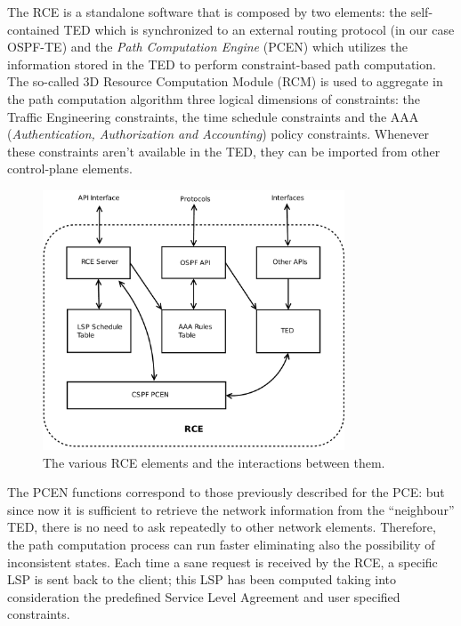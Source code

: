 \documentclass[10pt,a4paper]{report}
\begin{document}
The RCE is a standalone software that is composed by two elements: the
self-contained TED which is synchronized to an external routing
protocol (in our case OSPF-TE) and the \textit{Path Computation
  Engine} (PCEN) which utilizes the information stored in the TED to
perform constraint-based path computation. The so-called 3D Resource
Computation Module (RCM) is used to aggregate in the path computation
algorithm three logical dimensions of constraints: the Traffic
Engineering constraints, the time schedule constraints and the AAA
(\textit{Authentication, Authorization and Accounting}) policy
constraints. Whenever these constraints aren't available in the TED,
they can be imported from other control-plane elements.\\

\begin{figure}[!htbp]
  \begin{center}
    \includegraphics[width=0.8\textwidth]{img/rce_model}
    \caption[RCE model]{The various RCE elements and the
      interactions between them.}
    \label{fig:rce_model}
  \end{center}
\end{figure}

\newpage

The PCEN functions correspond to those previously described for the
PCE: but since now it is sufficient to retrieve the network
information from the ``neighbour'' TED, there is no need to ask
repeatedly to other network elements. Therefore, the path computation
process can run faster eliminating also the possibility of
inconsistent states. Each time a sane request is received by the RCE,
a specific LSP is sent back to the client; this LSP has been computed
taking into consideration the predefined Service Level Agreement and
user specified constraints.
\end{document}
